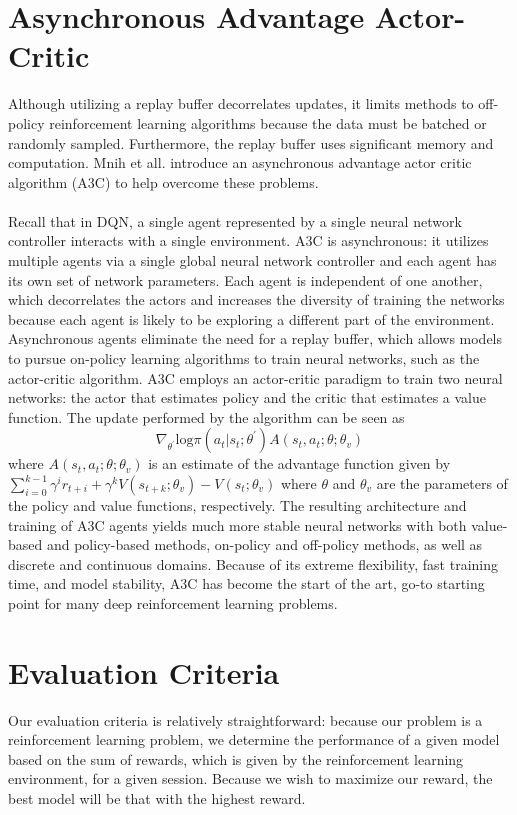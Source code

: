 \documentclass[journal,onecolumn]{IEEEtran}
\begin{document}
\section{Asynchronous Advantage Actor-Critic}
Although utilizing a replay buffer decorrelates updates, it limits methods to off-policy reinforcement learning algorithms because the data must be batched or randomly sampled. Furthermore, the replay buffer uses significant memory and computation. Mnih et all. introduce an asynchronous advantage actor critic algorithm (A3C) to help overcome these problems. \\\\
Recall that in DQN, a single agent represented by a single neural network controller interacts with a single environment. A3C is asynchronous: it utilizes multiple agents via a single global neural network controller and each agent has its own set of network parameters. Each agent is independent of one another, which decorrelates the actors and increases the diversity of training the networks because each agent is likely to be exploring a different part of the environment. Asynchronous agents eliminate the need for a replay buffer, which allows models to pursue on-policy learning algorithms to train neural networks, such as the actor-critic algorithm. A3C employs an actor-critic paradigm to train two neural networks: the actor that estimates policy and the critic that estimates a value function. The update performed by the algorithm can be seen as
\[
\nabla_{\theta^{'}}\text{log}\pi(a_{t}|s_{t};\theta^{'})A(s_{t},a_{t};\theta;\theta_{v})
\]
where $A(s_{t},a_{t};\theta;\theta_{v})$ is an estimate of the advantage function given by $\sum_{i=0}^{k-1}\gamma^{i}r_{t+i}+\gamma^{k}V(s_{t+k};\theta_{v}) - V(s_{t};\theta_{v})$ where $\theta$ and $\theta_{v}$ are the parameters of the policy and value functions, respectively. The resulting architecture and training of A3C agents yields much more stable neural networks with both value-based and policy-based methods, on-policy and off-policy methods, as well as discrete and continuous domains. Because of its extreme flexibility, fast training time, and model stability, A3C has become the start of the art, go-to starting point for many deep reinforcement learning problems. 
\section{Evaluation Criteria}
Our evaluation criteria is relatively straightforward: because our problem is a reinforcement learning problem, we determine the performance of a given model based on the sum of rewards, which is given by the reinforcement learning environment, for a given session. Because we wish to maximize our reward, the best model will be that with the highest reward. 
\end{document}
